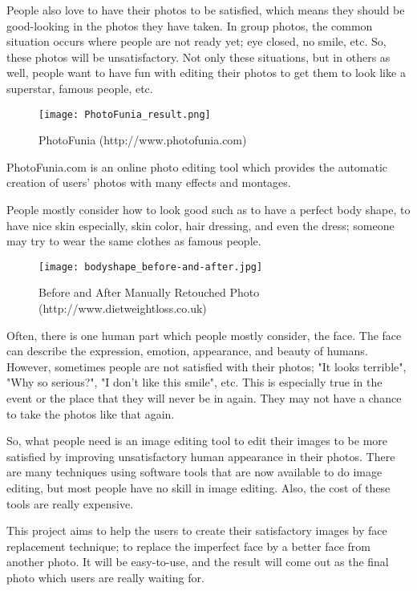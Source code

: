 People also love to have their photos to be satisfied, which means they should be good-looking in the photos they have taken. In group photos, the common situation occurs where people are not ready yet; eye closed, no smile, etc. So, these photos will be unsatisfactory. Not only these situations, but in others as well, people want to have fun with editing their photos to get them to look like a superstar, famous people, etc.

\begin{figure}[htb]
   \centering
   \texttt{[image: PhotoFunia\_result.png]}
   \caption{PhotoFunia (http://www.photofunia.com)}
   \label{fig:PhotoFunia}
\end{figure}

PhotoFunia.com is an online photo editing tool which provides the automatic creation of users' photos with many effects and montages.

People mostly consider how to look good such as to have a perfect body shape, to have nice skin especially, skin color, hair dressing, and even the dress; someone may try to wear the same clothes as famous people.
\begin{figure}[htb]
   \centering
   \texttt{[image: bodyshape\_before-and-after.jpg]}
   \caption{Before and After Manually Retouched Photo\\(http://www.dietweightloss.co.uk)}
   \label{fig:bodyshape}
\end{figure}

Often, there is one human part which people mostly consider, the face. The face can describe the expression, emotion, appearance, and beauty of humans. However, sometimes people are not satisfied with their photos; "It looks terrible", "Why so serious?", "I don't like this smile", etc. This is especially true in the event or the place that they will never be in again. They may not have a chance to take the photos like that again.

So, what people need is an image editing tool to edit their images to be more satisfied by improving unsatisfactory human appearance in their photos. There are many techniques using software tools that are now available to do image editing, but most people have no skill in image editing. Also, the cost of these tools are really expensive.

This project aims to help the users to create their satisfactory images by face replacement technique; to replace the imperfect face by a better face from another photo. It will be easy-to-use, and the result will come out as the final photo which users are really waiting for.


